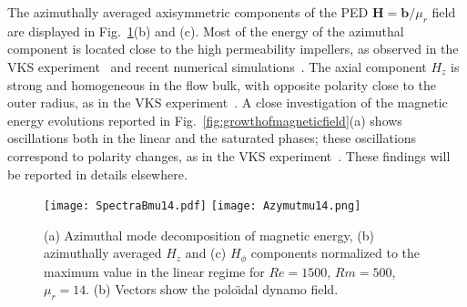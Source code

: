 \documentclass[aps,prl,twocolumn,showpacs,amsmath,amssymb]{revtex4-1}%
\begin{document}
The azimuthally averaged axisymmetric components of the PED $\mathbf{H} = \mathbf{b}/\mu_r$ field are displayed in Fig.~\ref{fig:energymode}(b) and (c). Most of the energy of the azimuthal component is located close to the high permeability impellers, as observed in the VKS experiment~\cite{paper:boisson:2012} and recent numerical simulations~\cite{nore_direct_2016}. The axial component $H_z$ is strong and homogeneous in the flow bulk, with opposite polarity close to the outer radius, as in the VKS experiment~\cite{paper:boisson:2012}. A close investigation of the magnetic energy evolutions reported in Fig.~\ref{fig:growthofmagneticfield}(a) shows oscillations both in the linear and the saturated phases; these oscillations correspond to polarity changes, as in the VKS experiment~\cite{paper:ravelet:2008.1}.  These findings will be reported in details elsewhere. 
 


\begin{figure}
\texttt{[image: SpectraBmu14.pdf]}
\texttt{[image: Azymutmu14.png]}
\caption{(a) Azimuthal mode decomposition of magnetic energy, (b) azimuthally averaged $H_z$ and (c) $H_\phi$ components normalized to the maximum value in the linear regime for $Re=1500$, $Rm=500$, $\mu_r = 14$.  (b) Vectors show the polo\"\i dal dynamo field.}
\label{fig:energymode}
\end{figure}

\vspace{.2 cm}
\end{document}
